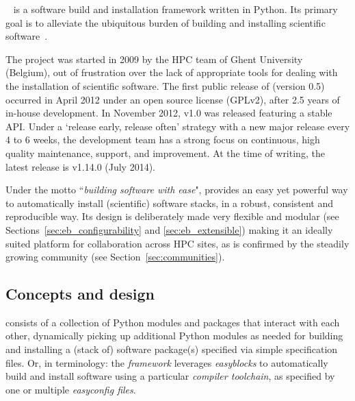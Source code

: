 \easybuild{}~\cite{EasyBuildSC12} is a software build and installation framework
written in Python. Its primary goal is to alleviate the ubiquitous burden of
building and installing scientific software~\cite{Dubois03}.

The \easybuild{} project was started in 2009 by the HPC team of Ghent
University (Belgium), out of frustration over the lack of appropriate tools for
dealing with the installation of scientific software. The first public release of
\easybuild{} (version 0.5) occurred in April 2012 under an open source license
(GPLv2), after 2.5 years of in-house
development. In November 2012, \easybuild{} v1.0 was released featuring
a stable API. Under a `release early, release often' strategy with a new major
release every 4 to 6 weeks, the development team has a strong focus on continuous,
high quality maintenance, support, and improvement. At the time of
writing, the latest release is \easybuild{} v1.14.0 (July 2014).

Under the motto ``\emph{building software with ease}", \easybuild{} provides
an easy
yet powerful way to automatically install (scientific) software stacks, in a robust,
consistent and reproducible way. Its design is deliberately made very flexible and
modular (see Sections~\ref{sec:eb_configurability} and \ref{sec:eb_extensible})
making it an ideally suited 
platform for collaboration across HPC sites, as is
confirmed by the steadily growing \easybuild{} community (see
Section~\ref{sec:communities}).

\subsection{Concepts and design}

\easybuild{} consists of a collection of Python modules and packages that
interact with each other, dynamically picking up additional Python modules as needed
for building and installing a (stack of) software package(s) specified via simple
specification files. Or, in \easybuild{} terminology: the \easybuild{}
\emph{framework} leverages \emph{easyblocks} to automatically build and install
software using a particular \emph{compiler toolchain}, as specified by one or
multiple \emph{easyconfig files}.

